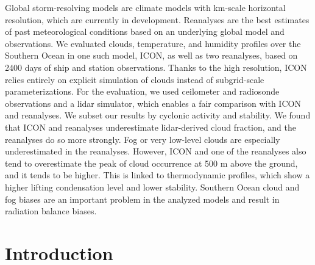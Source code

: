 \documentclass[draft]{agujournal2019}
\begin{document}
Global storm-resolving models are climate models with km-scale horizontal resolution, which are currently in development. Reanalyses are the best estimates of past meteorological conditions based on an underlying global model and observations. We evaluated clouds, temperature, and humidity profiles over the Southern Ocean in one such model, ICON, as well as two reanalyses, based on 2400 days of ship and station observations. Thanks to the high resolution, ICON relies entirely on explicit simulation of clouds instead of subgrid-scale parameterizations. For the evaluation, we used ceilometer and radiosonde observations and a lidar simulator, which enables a fair comparison with ICON and reanalyses. We subset our results by cyclonic activity and stability. We found that ICON and reanalyses underestimate lidar-derived cloud fraction, and the reanalyses do so more strongly. Fog or very low-level clouds are especially underestimated in the reanalyses. However, ICON and one of the reanalyses also tend to overestimate the peak of cloud occurrence at 500 m above the ground, and it tends to be higher. This is linked to thermodynamic profiles, which show a higher lifting condensation level and lower stability. Southern Ocean cloud and fog biases are an important problem in the analyzed models and result in radiation balance biases.

\section{Introduction}
\label{sec:introduction}
\end{document}
